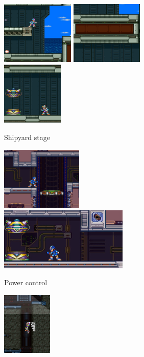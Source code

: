\begin{figure}[htp]
	\centering
	\begin{subfigure}{\linewidth}
		\centering
		\includegraphics[height=3cm]{figures/X3/Crush_crawfish/vile_1.jpg}
		\includegraphics[height=3cm]{figures/X3/Crush_crawfish/vile_11.jpg}
		\includegraphics[height=3cm]{figures/X3/Crush_crawfish/vile_2.jpg}
		\caption{Shipyard stage}
	\end{subfigure}
	\begin{subfigure}{\linewidth}
		\centering
		\includegraphics[height=3cm]{figures/X3/Volt_catfish/vile_1.jpg}
		\includegraphics[height=3cm]{figures/X3/Volt_catfish/vile_2.jpg}
		\caption{Power control }
	\end{subfigure}
	\begin{subfigure}{\linewidth}
		\centering
		\includegraphics[height=3cm]{figures/X3/Blizzard_buffalo/Vile_1.jpg}

\end{subfigure}
\end{figure}
